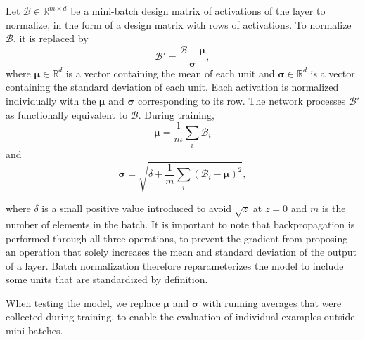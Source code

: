 Let $\mathcal{B} \in \mathbb{R}^{m\times d}$ be a mini-batch design matrix of activations of the layer to normalize, in the form of a design matrix with rows of activations. To normalize $\mathcal{B}$, it is replaced by
\begin{equation}
    \mathcal{B}' = \frac{\mathcal{B} - \boldsymbol{\mu}}{\boldsymbol{\sigma}},
\end{equation}
where $\boldsymbol{\mu} \in \mathbb{R}^d$ is a vector containing the mean of each unit and $\boldsymbol{\sigma} \in \mathbb{R}^d$ is a vector containing the standard deviation of each unit. Each activation is normalized individually with the $\boldsymbol{\mu}$ and $\boldsymbol{\sigma}$ corresponding to its row. The network processes $\mathcal{B}'$ as functionally equivalent to $\mathcal{B}$. During training,
\begin{equation}
    \boldsymbol{\mu} = \frac{1}{m}\sum_i \mathcal{B}_i
\end{equation}
and
\begin{equation}
    \boldsymbol{\sigma} = \sqrt{\delta + \frac{1}{m} \sum_i (\mathcal{B}_i - \boldsymbol{\mu})^2},
\end{equation}

where $\delta$ is a small positive value introduced to avoid $\sqrt{z}$ at $z = 0$ and $m$ is the number of elements in the batch. It is important to note that backpropagation is performed through all three operations, to prevent the gradient from proposing an operation that solely increases the mean and standard deviation of the output of a layer. Batch normalization therefore reparameterizes the model to include some units that are standardized by definition.

When testing the model, we replace $\boldsymbol{\mu}$ and $\boldsymbol{\sigma}$ with running averages that were collected during training, to enable the evaluation of individual examples outside mini-batches.

